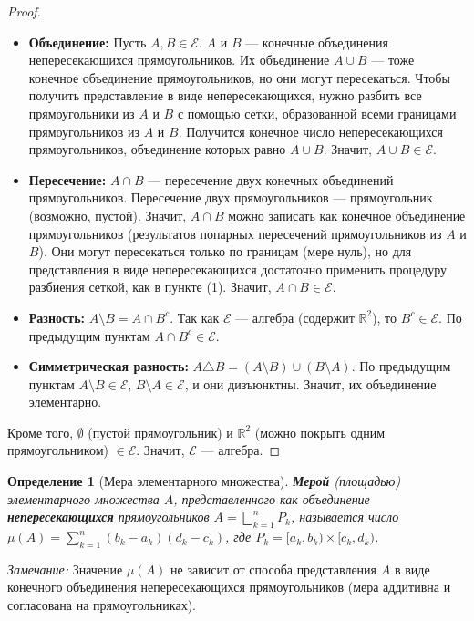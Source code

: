 \documentclass[a4paper, 12pt]{article}
\newtheorem{definition}{Определение}
\newcommand{\R}{\mathbb{R}}
\newcommand{\1}{\mathbf{1}}
\begin{document}
\begin{proof}
    \hfill
    \begin{itemize}
        \item \textbf{Объединение:} Пусть $A, B \in \mathcal{E}$. $A$ и $B$ — конечные объединения непересекающихся прямоугольников. Их объединение $A \cup B$ — тоже конечное объединение прямоугольников, но они могут пересекаться. Чтобы получить представление в виде непересекающихся, нужно разбить все прямоугольники из $A$ и $B$ с помощью сетки, образованной всеми границами прямоугольников из $A$ и $B$. Получится конечное число непересекающихся прямоугольников, объединение которых равно $A \cup B$. Значит, $A \cup B \in \mathcal{E}$.
        \item \textbf{Пересечение:} $A \cap B$ — пересечение двух конечных объединений прямоугольников. Пересечение двух прямоугольников — прямоугольник (возможно, пустой). Значит, $A \cap B$ можно записать как конечное объединение прямоугольников (результатов попарных пересечений прямоугольников из $A$ и $B$). Они могут пересекаться только по границам (мере нуль), но для представления в виде непересекающихся достаточно применить процедуру разбиения сеткой, как в пункте (1). Значит, $A \cap B \in \mathcal{E}$.
        \item \textbf{Разность:} $A \setminus B = A \cap B^c$. Так как $\mathcal{E}$ — алгебра (содержит $\R^2$), то $B^c \in \mathcal{E}$. По предыдущим пунктам $A \cap B^c \in \mathcal{E}$.
        \item \textbf{Симметрическая разность:} $A \triangle B = (A \setminus B) \cup (B \setminus A)$. По предыдущим пунктам $A \setminus B \in \mathcal{E}$, $B \setminus A \in \mathcal{E}$, и они дизъюнктны. Значит, их объединение элементарно.
    \end{itemize}
    Кроме того, $\emptyset$ (пустой прямоугольник) и $\R^2$ (можно покрыть одним прямоугольником) $\in \mathcal{E}$. Значит, $\mathcal{E}$ — алгебра.
\end{proof}

\begin{definition}[Мера элементарного множества]
    \textbf{Мерой} (площадью) элементарного множества $A$, представленного как объединение \textbf{непересекающихся} прямоугольников $A = \bigsqcup_{k=1}^n P_k$, называется число $\mu(A) = \sum_{k=1}^n (b_k - a_k)(d_k - c_k)$, где $P_k = [a_k, b_k) \times [c_k, d_k)$.
\end{definition}
\textit{Замечание:} Значение $\mu(A)$ не зависит от способа представления $A$ в виде конечного объединения непересекающихся прямоугольников (мера аддитивна и согласована на прямоугольниках).
\end{document}
